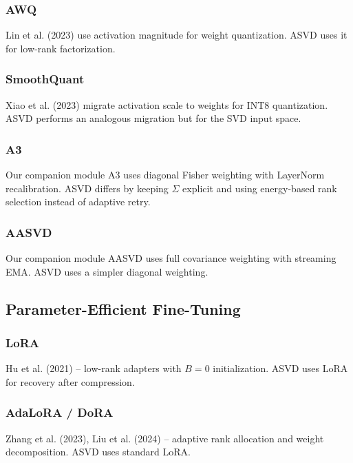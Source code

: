 \subsubsection{AWQ}

Lin et al. (2023) use activation magnitude for weight quantization. 
ASVD uses it for low-rank factorization.

\subsubsection{SmoothQuant}

Xiao et al. (2023) migrate activation scale to weights for INT8 quantization. 
ASVD performs an analogous migration but for the SVD input space.

\subsubsection{A3}

Our companion module A3 uses diagonal Fisher weighting with LayerNorm 
recalibration. ASVD differs by keeping $\Sigma$ explicit and using energy-based 
rank selection instead of adaptive retry.

\subsubsection{AASVD}

Our companion module AASVD uses full covariance weighting with streaming 
EMA. ASVD uses a simpler diagonal weighting.

\subsection{Parameter-Efficient Fine-Tuning}

\subsubsection{LoRA}

Hu et al. (2021) -- low-rank adapters with $B=0$ initialization. ASVD uses 
LoRA for recovery after compression.

\subsubsection{AdaLoRA / DoRA}

Zhang et al. (2023), Liu et al. (2024) -- adaptive rank allocation and 
weight decomposition. ASVD uses standard LoRA.

